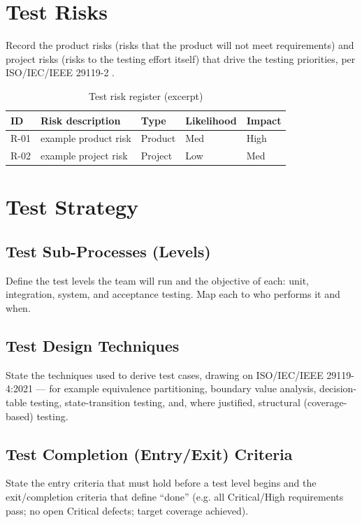 \documentclass[11pt,letterpaper]{article}
\begin{document}
\section{Test Risks}
Record the product risks (risks that the product will not meet requirements) and project risks (risks to the testing effort itself) that drive the testing priorities, per ISO/IEC/IEEE 29119-2 \cite{ISO29119part2}.

\begin{table}[H]
\caption{Test risk register (excerpt)}
\begin{center}
    \begin{tabular}{ | p{1.5cm} | p{6cm} | p{2cm} | p{2cm} | p{1.5cm} |}
    \hline
    \textbf{ID} & \textbf{Risk description} & \textbf{Type} & \textbf{Likelihood} & \textbf{Impact} \\ \hline
    R-01 & example product risk & Product & Med & High \\ \hline
    R-02 & example project risk & Project & Low & Med \\ \hline
    \end{tabular}
\end{center}
\end{table}

\section{Test Strategy}
\subsection{Test Sub-Processes (Levels)}
Define the test levels the team will run and the objective of each: unit, integration, system, and acceptance testing. Map each to who performs it and when.

\subsection{Test Design Techniques}
State the techniques used to derive test cases, drawing on ISO/IEC/IEEE 29119-4:2021 \cite{ISO29119part4} --- for example equivalence partitioning, boundary value analysis, decision-table testing, state-transition testing, and, where justified, structural (coverage-based) testing.

\subsection{Test Completion (Entry/Exit) Criteria}
State the entry criteria that must hold before a test level begins and the exit/completion criteria that define ``done'' (e.g. all Critical/High requirements pass; no open Critical defects; target coverage achieved).
\end{document}
